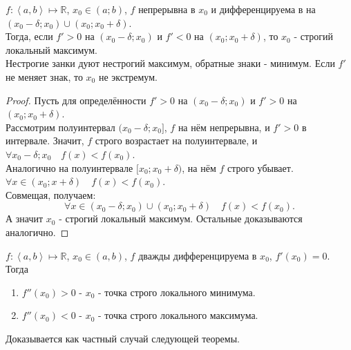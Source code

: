 \documentclass[11pt, oneside]{article}   	%
\begin{document}
    \begin{theorem}
        $f: \left<a, b\right> \mapsto \mathbb{R}$, $x_0\in (a; b)$, $f$ непрерывна в $x_0$ и дифференцируема в на $(x_0-\delta;x_0) \cup (x_0; x_0+\delta)$.\\
        Тогда, если
        $f'>0$ на $(x_0-\delta; x_0)$ и $f' < 0$ на $(x_0; x_0+\delta)$, то $x_0$ - строгий локальный максимум.\\
        Нестрогие занки дуют нестрогий максимум, обратные знаки - минимум.
        Если $f'$ не меняет знак, то $x_0$ не экстремум.
        \begin{proof}
            Пусть для определённости $f'>0$ на $(x_0-\delta; x_0)$ и $f'>0$ на $(x_0; x_0+\delta)$.\\
            Рассмотрим полуинтервал $(x_0-\delta; x_0]$, $f$ на нём непрерывна, и $f'>0$ в интервале. Значит, $f$ строго возрастает на полуинтервале, и $\forall{x_0-\delta; x_0}\quad f(x) < f(x_0)$.\\
            Аналогично на полуинтервале $[x_0; x_0+\delta)$, на нём $f$ строго убывает. $\forall{x\in (x_0; x+\delta)}\quad f(x) < f(x_0)$.\\
            Совмещая, получаем:
            \[ \forall{x\in (x_0-\delta; x_0)\cup (x_0; x_0+\delta)}\quad f(x) < f(x_0)  .\]
            А значит $x_0$ - строгий локальный максимум. Остальные доказываются аналогично.
        \end{proof}
    \end{theorem}
    \begin{theorem}
        $f: \left<a, b\right> \mapsto \mathbb{R}$, $x_0\in (a, b)$, $f$ дважды дифференцируема в $x_0$, $f'(x_0) = 0$.\\
        Тогда
        \begin{enumerate}
            \item $f''(x_0) > 0$ - $x_0$ - точка строго локального минимума.
            \item $f''(x_0) < 0$ - $x_0$ - точка строго локального максимума.
        \end{enumerate}
        Доказывается как частный случай следующей теоремы.
    \end{theorem}
\end{document}

